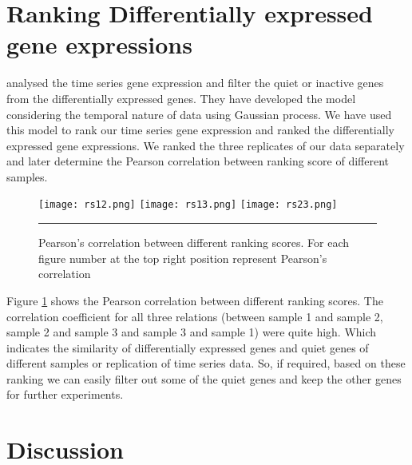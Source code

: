 \section{Ranking Differentially expressed gene expressions}
\cite{Kalaitzis:2011} analysed the time series gene expression and filter the quiet or inactive genes from the differentially expressed genes. They have developed the model considering the temporal nature of data using Gaussian process. We have used this model to rank our time series gene expression and ranked the differentially expressed gene expressions. We ranked the three replicates of our data separately and later determine the Pearson correlation between ranking score of different samples.

\begin{figure}
	\centering
		\texttt{[image: rs12.png]}
		\texttt{[image: rs13.png]}
		\texttt{[image: rs23.png]}
		\rule{35em}{0.5pt}
	\caption[Pearson's correlation between different ranking scores]
		{Pearson's correlation between different ranking scores. For each figure number at the top right position represent Pearson's correlation}
	\label{fig:ranking_scores}
\end{figure}

Figure \ref{fig:ranking_scores} shows the Pearson correlation between different ranking scores. The correlation coefficient for all three relations (between sample 1 and sample 2, sample 2 and sample 3 and
sample 3 and sample 1) were quite high. Which indicates the similarity of differentially expressed genes and quiet genes of different samples or replication of time series data. So, if required, based on these ranking we can easily filter out some of the quiet genes and keep the other genes for further experiments.

\section{Discussion}


% 
%
